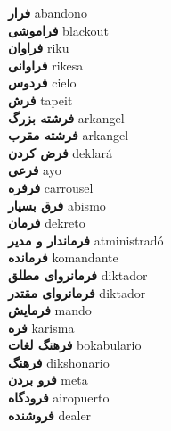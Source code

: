\textbf{ فرار  } abandono \\
\textbf{ فراموشی  } blackout \\
\textbf{ فراوان  } riku \\
\textbf{ فراوانی  } rikesa \\
\textbf{ فردوس  } cielo \\
\textbf{ فرش  } tapeit \\
\textbf{ فرشته بزرگ  } arkangel \\
\textbf{ فرشته مقرب  } arkangel \\
\textbf{ فرض کردن  } deklará \\
\textbf{ فرعی  } ayo \\
\textbf{ فرفره  } carrousel \\
\textbf{ فرق بسیار  } abismo \\
\textbf{ فرمان  } dekreto \\
\textbf{ فرماندار و مدیر  } atministradó \\
\textbf{ فرمانده  } komandante \\
\textbf{ فرمانروای مطلق  } diktador \\
\textbf{ فرمانروای مقتدر  } diktador \\
\textbf{ فرمایش  } mando \\
\textbf{ فره  } karisma \\
\textbf{ فرهنگ لغات  } bokabulario \\
\textbf{ فرهنگ  } dikshonario \\
\textbf{ فرو بردن  } meta \\
\textbf{ فرودگاه  } airopuerto \\
\textbf{ فروشنده  } dealer \\
